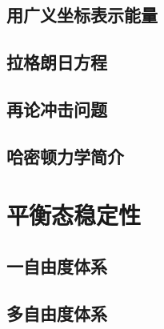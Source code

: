 \subsection{用广义坐标表示能量}

\subsection{拉格朗日方程}

\subsection{再论冲击问题}

\subsection{哈密顿力学简介}

\section{平衡态稳定性}

\subsection{一自由度体系}

\subsection{多自由度体系}
